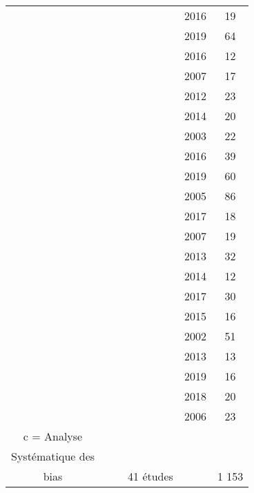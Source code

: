 \begin{tabular}{ cccccc }
\cmidrule(lr){2-6}
 & & & \citeauthor{Bluschke2016} & 2016 & 19 \\
 & & & \citeauthor{Cueli2019} & 2019 & 64 \\
 & & & \citeauthor{Deilami2016} & 2016 & 12 \\
 & & & \citeauthor{Drechsler2007} & 2007 & 17 \\
 & & & \citeauthor{Duric2012} & 2012 & 23 \\
 & & & \citeauthor{Escolano2014} & 2014 & 20 \\
 & & & \citeauthor{Fuchs2003} & 2003 & 22 \\
 & & & \citeauthor{Gelade2016} & 2016 & 39 \\
 & & & \citeauthor{Heinrich2019} & 2019 & 60 \\
 & & & \citeauthor{Kropotov2005} & 2005 & 86 \\
 & & & \citeauthor{Lee2017} & 2017 & 18 \\
 & & & \citeauthor{Leins2007} & 2007 & 19 \\
 & & & \citeauthor{Li2013} & 2013 & 32 \\
 & & & \citeauthor{Meisel2014} & 2014 & 12 \\
 & & & \citeauthor{Mohagheghi2017} & 2017 & 30 \\
 & & & \citeauthor{Mohammadi2015} & 2015 & 16 \\
 & & & \citeauthor{Monastra2002} & 2002 & 51 \\
 & & & \citeauthor{Ogrim2013} & 2013 & 13 \\
 & & & \citeauthor{Rajabi2019} & 2019 & 16 \\
 & & & \citeauthor{Sudnawa2018} & 2018 & 20 \\
 & & & \citeauthor{Strehl2006} & 2006 & 23 \\
 c = Analyse \\ Systématique des \\bias & & & 41 études & & 1 153 \\
\bottomrule
\end{tabular}
